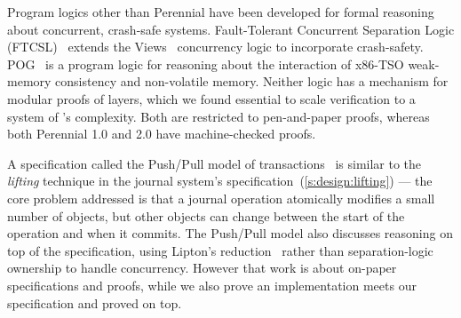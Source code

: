 Program logics other than Perennial
have been developed for formal reasoning about concurrent, crash-safe systems.
Fault-Tolerant Concurrent Separation Logic (FTCSL)~\cite{ntzik:faults} extends
the Views~\cite{dinsdale:views} concurrency logic to incorporate crash-safety.
POG~\cite{raad:pog} is a program logic for reasoning about the interaction of
x86-TSO weak-memory consistency and non-volatile memory.
Neither logic has a mechanism for modular proofs of layers,
which we found essential to scale verification to a system of \txn's
complexity. Both are restricted to pen-and-paper proofs, whereas both Perennial
1.0 and 2.0 have machine-checked proofs.

A specification called the Push/Pull model of
transactions~\cite{koskinen:pushpull} is similar to the \emph{lifting} technique
in the journal system's specification~(\autoref{s:design:lifting}) --- the core
problem addressed is that a journal operation atomically modifies a small number
of objects, but other objects can change between the start of the operation and when
it commits. The Push/Pull model also discusses reasoning on top of the
specification, using Lipton's reduction~\cite{lipton:movers} rather than
separation-logic ownership to handle concurrency. However that work is about
on-paper specifications and proofs, while we also prove an implementation meets
our specification and proved \simplenfs on top.
